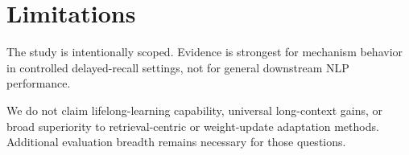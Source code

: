 \section{Limitations}
The study is intentionally scoped. Evidence is strongest for mechanism behavior in controlled delayed-recall settings, not for general downstream NLP performance.

We do not claim lifelong-learning capability, universal long-context gains, or broad superiority to retrieval-centric or weight-update adaptation methods. Additional evaluation breadth remains necessary for those questions.
